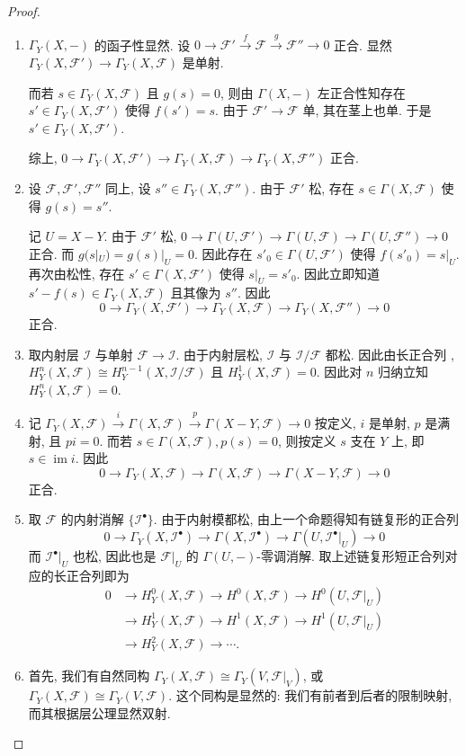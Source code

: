\documentclass{article}
\theoremstyle{exercise}
\theoremstyle{theorem}
\theoremstyle{remark}
\def\cF{\mathscr{F}}
\def\cI{\mathscr{I}}
\def\im{\operatorname{im}}
\begin{document}
\begin{proof} \hfill
  \begin{enumerate}[label=(\arabic*)]
    \item $\Gamma_Y(X, -)$ 的函子性显然.
          设 $0 \to \cF' \xrightarrow{f} \cF \xrightarrow{g} \cF'' \to 0$ 正合.
          显然 $\Gamma_Y(X, \cF') \to \Gamma_Y(X, \cF)$ 是单射.

          而若 $s \in \Gamma_Y(X, \cF)$ 且 $g(s) = 0$,
          则由 $\Gamma(X, -)$ 左正合性知存在 $s' \in \Gamma_Y(X, \cF')$ 使得 $f(s') = s$.
          由于 $\cF' \to \cF$ 单, 其在茎上也单. 于是 $s' \in \Gamma_Y(X, \cF')$.

          综上, $0 \to \Gamma_Y(X, \cF') \to \Gamma_Y(X, \cF) \to \Gamma_Y(X, \cF'')$
          正合.
    \item 设 $\cF, \cF', \cF''$ 同上, 设  $s'' \in \Gamma_Y(X, \cF'')$.
          由于 $\cF'$ 松, 存在 $s \in \Gamma(X, \cF)$ 使得 $g(s) = s''$.

          记  $U = X - Y$. 由于 $\cF'$ 松,
          $0 \to \Gamma(U, \cF') \to \Gamma(U, \cF) \to \Gamma(U, \cF'') \to 0$ 正合.
          而 $g(s|_U) = g(s)|_U = 0$. 因此存在  $s'_0 \in \Gamma(U, \cF')$
          使得 $f(s'_0) = s|_U$. 再次由松性, 存在 $s' \in \Gamma(X, \cF')$
          使得 $s|_U = s'_0$. 因此立即知道 $s' - f(s) \in \Gamma_Y(X, \cF)$
          且其像为 $s''$. 因此
          \[ 0 \to \Gamma_Y(X, \cF') \to \Gamma_Y(X, \cF) \to \Gamma_Y(X, \cF'') \to 0 \]
          正合.
    \item 取内射层 $\cI$ 与单射 $\cF \to \cI$. 由于内射层松, $\cI$ 与 $\cI / \cF$ 都松.
          因此由长正合列 , $H_Y^n(X, \cF) \cong H_Y^{n-1}(X, \cI / \cF)$
          且 $H_Y^1(X, \cF) = 0$.
          因此对 $n$ 归纳立知 $H_Y^n(X, \cF) = 0$.
    \item 记
          $\Gamma_Y(X, \cF) \xrightarrow{i} \Gamma(X, \cF)
          \xrightarrow{p} \Gamma(X - Y, \cF) \to 0$
          按定义, $i$ 是单射, $p$ 是满射, 且 $pi = 0$.
          而若 $s \in \Gamma(X, \cF), p(s) = 0$, 则按定义 $s$ 支在 $Y$ 上,
          即 $s \in \im i$. 因此
          \[ 0 \to \Gamma_Y(X, \cF) \to \Gamma(X, \cF) \to \Gamma(X - Y, \cF) \to 0 \]
          正合.
    \item 取 $\cF$ 的内射消解 $\{\cI^\bullet\}$.
          由于内射模都松, 由上一个命题得知有链复形的正合列
          \[
          0 \to \Gamma_Y(X, \cI^\bullet)
          \to \Gamma(X, \cI^\bullet)
          \to \Gamma(U, \cI^\bullet|_U) \to 0
          \]
          而 $\cI^\bullet|_U$ 也松, 因此也是 $\cF|_U$ 的 $\Gamma(U, -)$-零调消解.
          取上述链复形短正合列对应的长正合列即为
          \begin{align*}
            0 & \to H_Y^0(X, \cF) \to H^0(X, \cF) \to H^0(U, \cF|_U) \\
              & \to H_Y^1(X, \cF) \to H^1(X, \cF) \to H^1(U, \cF|_U) \\
              & \to H_Y^2(X, \cF) \to \cdots.
          \end{align*}
    \item 首先, 我们有自然同构 $\Gamma_Y(X, \cF) \cong \Gamma_Y(V, \cF|_V)$,
          或 $\Gamma_Y(X, \cF) \cong \Gamma_Y(V, \cF)$.
          这个同构是显然的: 我们有前者到后者的限制映射, 而其根据层公理显然双射.


\end{enumerate}
\end{proof}
\end{document}
